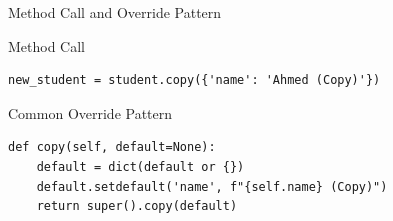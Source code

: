 \begin{frame}[fragile]{Method Call and Override Pattern}
\begin{block}{Method Call}
\begin{lstlisting}
new_student = student.copy({'name': 'Ahmed (Copy)'})
\end{lstlisting}
\end{block}
\begin{block}{Common Override Pattern}
\begin{lstlisting}
def copy(self, default=None):
	default = dict(default or {})
	default.setdefault('name', f"{self.name} (Copy)")
	return super().copy(default)
\end{lstlisting}
\end{block}
\end{frame}
